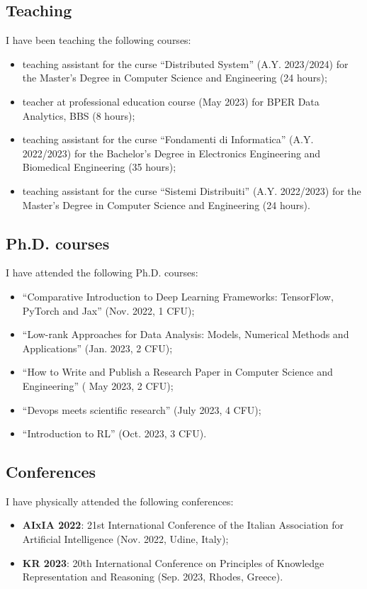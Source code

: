 \documentclass[]{scrartcl}
\begin{document}
    \subsection{Teaching}
    \label{sec:done:teaching}
    I have been teaching the following courses:
    \begin{itemize}
        \item teaching assistant for the curse ``Distributed System'' (A.Y. 2023/2024) for the Master's Degree in Computer Science and Engineering (24 hours);
        \item teacher at professional education course (May 2023) for BPER Data Analytics, BBS (8 hours);
        \item teaching assistant for the curse ``Fondamenti di Informatica'' (A.Y. 2022/2023) for the Bachelor's Degree in Electronics Engineering and Biomedical Engineering (35 hours);
        \item teaching assistant for the curse ``Sistemi Distribuiti'' (A.Y. 2022/2023) for the Master's Degree in Computer Science and Engineering (24 hours).
    \end{itemize}

    \subsection{Ph.D. courses}
    \label{sec:done:courses}
    I have attended the following Ph.D. courses:
    \begin{itemize}
        \item ``Comparative Introduction to Deep Learning Frameworks: TensorFlow, PyTorch and Jax'' (Nov. 2022, 1 CFU);
        \item ``Low-rank Approaches for Data Analysis: Models, Numerical Methods and Applications'' (Jan. 2023, 2 CFU);
        \item ``How to Write and Publish a Research Paper in Computer Science and Engineering'' ( May 2023, 2 CFU);
        \item ``Devops meets scientific research'' (July 2023, 4 CFU);
        \item ``Introduction to RL'' (Oct. 2023, 3 CFU).
    \end{itemize}

    \subsection{Conferences}
    \label{sec:done:conferences}
    I have physically attended the following conferences:
    \begin{itemize}
        \item \textbf{AIxIA 2022}: 21st International Conference of the Italian Association for Artificial Intelligence (Nov. 2022, Udine, Italy);
        \item \textbf{KR 2023}: 20th International Conference on Principles of Knowledge Representation and Reasoning (Sep. 2023, Rhodes, Greece).
    \end{itemize}
\end{document}
